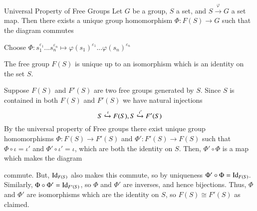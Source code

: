 \documentclass[12pt, a4paper, twoside, openright, titlepage]{book}
\begin{document}
\begin{namthm}{Universal Property of Free Groups}{}
        Let $G$ be a group, $S$ a set, and $S\xrightarrow{\varphi}G$ a set map. Then there exists a unique group homomorphism $\Phi:F(S)\rightarrow G$ such that the diagram commutes 
        \begin{center}
        \end{center}
\end{namthm}
\begin{proof*}{}{}
        Choose $\Phi:s_1^{\varepsilon_1}...s_n^{\varepsilon_n}\mapsto \varphi(s_1)^{\varepsilon_1}...\varphi(s_n)^{\varepsilon_n}$
\end{proof*}


\begin{cor}{}{}
        The free group $F(S)$ is unique up to an isomorphism which is an identity on the set $S$.
\end{cor}
\begin{proof*}{}{}
        Suppose $F(S)$ and $F'(S)$ are two free groups generated by $S$. Since $S$ is contained in both $F(S)$ and $F'(S)$ we have natural injections \begin{equation}
                S\xhookrightarrow{\iota}F(S),S\xhookrightarrow{\iota'}F'(S)
        \end{equation}
        By the universal property of Free groups there exist unique group homomorphisms $\Phi:F(S)\rightarrow F'(S)$ and $\Phi':F'(S)\rightarrow F(S)$ such that $\Phi \circ \iota = \iota'$ and $\Phi'\circ \iota' = \iota$, which are both the identity on $S$. Then, $\Phi'\circ \Phi$ is a map which makes the diagram \begin{center}
        \end{center}
        commute. But, $\operatorname{Id}_{F(S)}$ also makes this commute, so by uniqueness $\Phi'\circ \Phi = \operatorname{Id}_{F(S)}$. Similarly, $\Phi\circ \Phi' = \operatorname{Id}_{F'(S)}$, so $\Phi$ and $\Phi'$ are inverses, and hence bijections. Thus, $\Phi$ and $\Phi'$ are isomorphisms which are the identity on $S$, so $F(S)\cong F'(S)$ as claimed.
\end{proof*}
\end{document}
